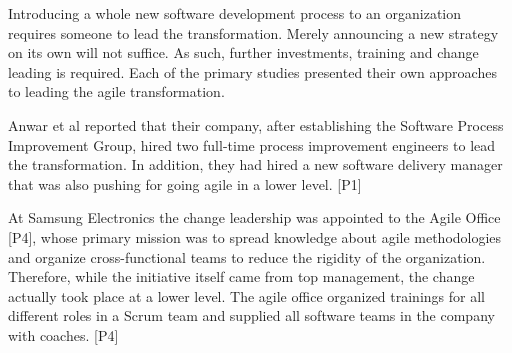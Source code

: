 Introducing a whole new software development process to an organization
requires someone to lead the transformation. Merely announcing a new
strategy on its own will not suffice. As such, further investments,
training and change leading is required. Each of the primary studies
presented their own approaches to leading the agile transformation.

Anwar et al reported that their company, after establishing the Software
Process Improvement Group, hired two full-time process improvement
engineers to lead the transformation. In addition, they had hired a new
software delivery manager that was also pushing for going agile in a
lower level. [P1]

At Samsung Electronics the change leadership was appointed to the Agile
Office [P4], whose primary mission was to spread knowledge about agile
methodologies and organize cross-functional teams to reduce the rigidity
of the organization. Therefore, while the initiative itself came from
top management, the change actually took place at a lower level. The
agile office organized trainings for all different roles in a Scrum team
and supplied all software teams in the company with coaches. [P4]
